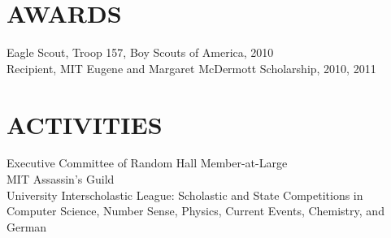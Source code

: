 \documentclass[margin]{res}
\begin{document}
\begin{resume}
 
\section{AWARDS} Eagle Scout, Troop 157, Boy Scouts of America, 2010\\
        Recipient, MIT Eugene and Margaret McDermott Scholarship, 2010, 2011

\section{ACTIVITIES}             
        Executive Committee of Random Hall Member-at-Large \\
        MIT Assassin's Guild \\
        University Interscholastic League: Scholastic and State Competitions in
        Computer Science, Number Sense, Physics, Current Events, Chemistry, and German
 

\end{resume}
\end{document}
